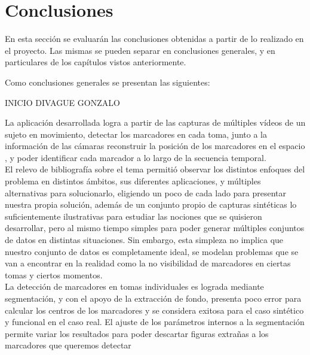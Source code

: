 \section{Conclusiones}

En esta sección se evaluarán las conclusiones obtenidas a partir de lo realizado en el proyecto. Las mismas se pueden separar en conclusiones generales, y en particulares de los capítulos vistos anteriormente.

Como conclusiones generales se presentan las siguientes:

INICIO DIVAGUE GONZALO

La aplicación desarrollada logra a partir de las capturas de múltiples vídeos de un sujeto en movimiento, detectar los marcadores en cada toma, junto a la información de las cámaras reconstruir la posición de los marcadores en el espacio , y poder identificar cada marcador a lo largo de la secuencia temporal.
\\ 

El relevo de bibliografía sobre el tema permitió observar los distintos enfoques del problema en distintos ámbitos, sus diferentes aplicaciones, y múltiples alternativas para solucionarlo, eligiendo un poco de cada lado para presentar nuestra propia solución, además de un conjunto propio de capturas sintéticas lo suficientemente ilustrativas para estudiar las nociones que se quisieron desarrollar, pero al mismo tiempo simples para poder generar múltiples conjuntos de datos en distintas situaciones. Sin embargo, esta simpleza no implica que nuestro conjunto de datos es completamente ideal, se modelan problemas que se van a encontrar en la realidad como la no visibilidad de marcadores en ciertas tomas y ciertos momentos.
\\ 

La detección de marcadores en tomas individuales es lograda mediante segmentación, y con el apoyo de la extracción de fondo, presenta poco error para calcular los centros de los marcadores y se considera exitosa para el caso sintético y funcional en el caso real. El ajuste de los parámetros internos a la segmentación permite variar los resultados para poder descartar figuras extrañas a los marcadores que queremos detectar
\\ 


